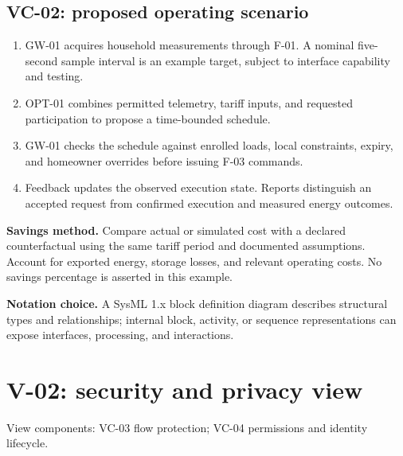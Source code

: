 \documentclass[11pt,letterpaper]{article}
\newcommand{\pageintro}[1]{{\color{Muted}#1}\par\vspace{3pt}}
\begin{document}
\subsection{VC-02: proposed operating scenario}
\begin{enumerate}
\item GW-01 acquires household measurements through F-01. A nominal five-second
sample interval is an example target, subject to interface capability and testing.
\item OPT-01 combines permitted telemetry, tariff inputs, and requested
participation to propose a time-bounded schedule.
\item GW-01 checks the schedule against enrolled loads, local constraints,
expiry, and homeowner overrides before issuing F-03 commands.
\item Feedback updates the observed execution state. Reports distinguish an
accepted request from confirmed execution and measured energy outcomes.
\end{enumerate}

\textbf{Savings method.} Compare actual or simulated cost with a declared
counterfactual using the same tariff period and documented assumptions. Account
for exported energy, storage losses, and relevant operating costs. No savings
percentage is asserted in this example.

\textbf{Notation choice.} A SysML 1.x block definition diagram describes structural
types and relationships; internal block, activity, or sequence representations
can expose interfaces, processing, and interactions.~\cite{omg-sysml}

\newpage
\section{V-02: security and privacy view}
\pageintro{View components: VC-03 flow protection; VC-04 permissions and identity lifecycle.}
\end{document}
